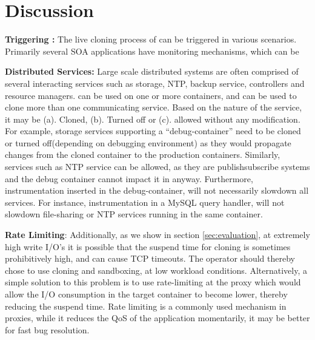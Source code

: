 \section{Discussion}
\label{sec:discussion}

\textbf{Triggering \parikshan:}
The live cloning process of \parikshan can be triggered in various scenarios. 
Primarily several SOA applications have monitoring mechanisms, which can be 

\textbf{Distributed Services:}  
Large scale distributed systems are often comprised of several interacting services such as storage, NTP, backup service, controllers and resource managers.
\parikshan can be used on one or more containers, and can be used to clone more than one communicating service.
Based on the nature of the service, it may be (a). Cloned, (b). Turned off or (c). allowed without any modification.
For example, storage services supporting a ``debug-container'' need to be cloned or turned off(depending on debugging environment) as they would propagate changes from the cloned container to the production containers.
Similarly, services such as NTP service can be allowed, as they are publish\/subscribe systems and the debug container cannot impact it in anyway.
Furthermore, instrumentation inserted in the debug-container, will not necessarily slowdown all services.
For instance, instrumentation in a MySQL query handler, will not slowdown file-sharing or NTP services running in the same container.



\textbf{Rate Limiting}: 
Additionally, as we show in section \ref{sec:evaluation}, at extremely high write I/O's it is possible that the suspend time for cloning is sometimes prohibitively high, and can cause TCP timeouts. 
The operator should thereby chose to use cloning and sandboxing, at low workload conditions. 
Alternatively, a simple solution to this problem is to use rate-limiting at the proxy which would allow the I/O consumption in the target container to become lower, thereby reducing the suspend time.
Rate limiting is a commonly used mechanism in proxies, while it reduces the QoS of the application momentarily, it may be better for fast bug resolution.

